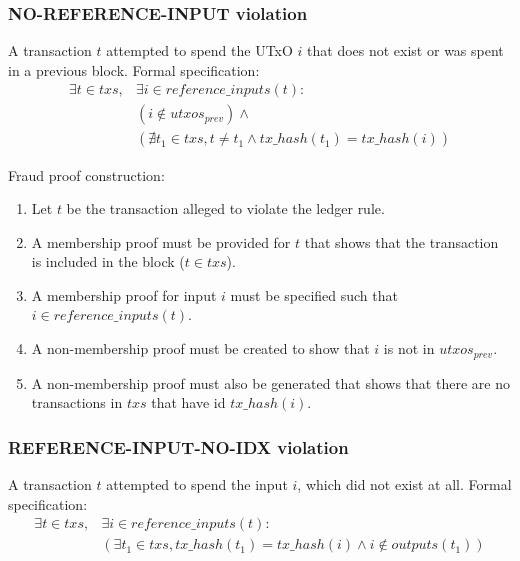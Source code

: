 \documentclass[../midgard.tex]{subfiles}
\begin{document}
\subsubsection{NO-REFERENCE-INPUT violation}
\label{violation:NO-REFERENCE-INPUT}
A transaction $t$ attempted to spend the UTxO $i$ that does not exist or was spent in a previous block.
Formal specification:
\begin{equation*}
\begin{split}
    \exists t \in txs, &\exists i \in reference\_inputs(t): \\
    &( i \notin utxos_{prev} ) \land  \\
    &( \nexists t_1 \in txs, t \neq t_1 \land tx\_hash(t_1) = tx\_hash(i) )
\end{split}
\end{equation*}

Fraud proof construction:
\begin{enumerate}
  \item Let $t$ be the transaction alleged to violate the ledger rule. 
  \item A membership proof must be provided for $t$ that shows that the transaction is included in the block ($t \in txs$).
  \item A membership proof for input $i$ must be specified such that $i \in reference\_inputs(t)$.
  \item A non-membership proof must be created to show that $i$ is not in $utxos_{prev}$.
  \item A non-membership proof must also be generated that shows that there are no transactions in $txs$ that have id $tx\_hash(i)$.
\end{enumerate}

\subsubsection{REFERENCE-INPUT-NO-IDX violation}
\label{violation:REFERENCE-INPUT-NO-IDX}
A transaction $t$ attempted to spend the input $i$, which did not exist at all.
Formal specification:
\begin{equation*}
\begin{split}
    \exists t \in txs, &\exists i \in reference\_inputs(t): \\
    &( \exists t_1 \in txs, tx\_hash(t_1) = tx\_hash(i) \land i \notin outputs(t_1) )
\end{split}
\end{equation*}
\end{document}
